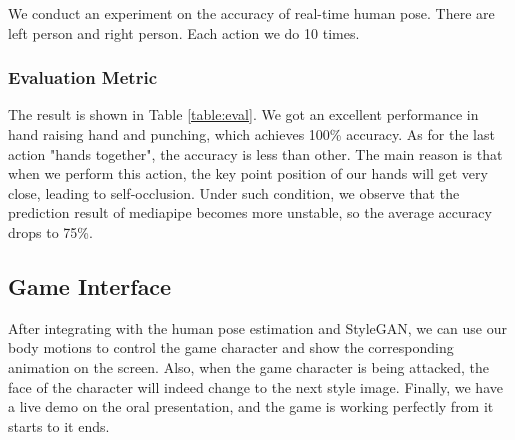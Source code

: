 We conduct an experiment on the accuracy of real-time human pose. There are left person and right person. Each action we do 10 times. 
\subsubsection{Evaluation Metric}
The result is shown in Table \ref{table:eval}. We got an excellent performance in hand raising hand and punching, which achieves 100\% accuracy. As for the last action "hands together", the accuracy is less than other. The main reason is that when we perform this action, the key point position of our hands will get very close, leading to self-occlusion. Under such condition, we observe that the prediction result of mediapipe becomes more unstable, so the average accuracy drops to 75\%.



\subsection{Game Interface}
After integrating with the human pose estimation and StyleGAN, we can use our body motions to control the game character and show the corresponding animation on the screen. Also, when the game character is being attacked, the face of the character will indeed change to the next style image. Finally, we have a live demo on the oral presentation, and the game is working perfectly from it starts to it ends.